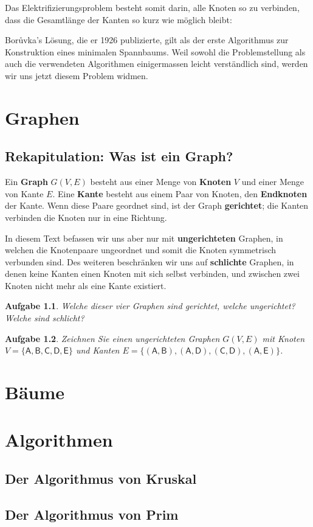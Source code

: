 \documentclass[12pt,a4paper]{report}
\theoremstyle{break}
\newtheorem{exercise}{Aufgabe}[section]
\begin{document}
Das Elektrifizierungsproblem besteht somit darin, alle Knoten so zu
verbinden, dass die Gesamtl\"{a}nge der Kanten so kurz wie m\"{o}glich bleibt:  

Bor\r{u}vka's L\"{o}sung, die er 1926 publizierte, gilt als der erste
Algorithmus zur Konstruktion eines minimalen Spannbaums. Weil sowohl
die Problemstellung als auch die verwendeten Algorithmen einigermassen
leicht verst\"{a}ndlich sind, werden wir uns jetzt diesem Problem widmen.

\chapter{Graphen}
\label{graphs}

\section{Rekapitulation: Was ist ein Graph?}

Ein \textbf{Graph} $G(V,E)$ besteht aus einer Menge von
\textbf{Knoten} $V$ und einer Menge von Kante $E$. Eine \textbf{Kante}
besteht aus einem Paar von Knoten, den \textbf{Endknoten} der
Kante. Wenn diese Paare geordnet sind, ist der Graph
\textbf{gerichtet}; die Kanten verbinden die Knoten nur in eine
Richtung. 

In diesem Text befassen wir uns aber nur mit
\textbf{ungerichteten} Graphen, in welchen die Knotenpaare ungeordnet
und somit die Knoten symmetrisch verbunden sind.  Des weiteren
beschr\"{a}nken wir uns auf \textbf{schlichte} Graphen, in denen keine
Kanten einen Knoten mit sich selbst verbinden, und zwischen zwei
Knoten nicht mehr als eine Kante existiert.

\begin{exercise}
Welche dieser vier Graphen sind gerichtet, welche ungerichtet? Welche
sind schlicht?

\end{exercise}

\begin{exercise}
Zeichnen Sie einen ungerichteten Graphen $G(V,E)$ mit Knoten 
$V = \{\mathsf{A,B,C,D,E}\}$ und Kanten 
$E = \{\mathsf{(A, B), (A, D), (C, D), (A, E)}\}$.
\end{exercise}
 
\chapter{B\"{a}ume}
\chapter{Algorithmen}
\section{Der Algorithmus von Kruskal}
\section{Der Algorithmus von Prim}
\end{document}
